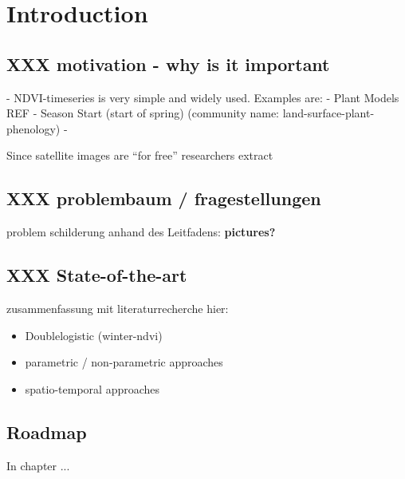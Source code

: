 \chapter{Introduction}

\section{XXX motivation - why is it important}{
    - NDVI-timeseries is very simple and widely used. 
        Examples are: 
            - Plant Models REF
            - Season Start (start of spring) (community name: land-surface-plant-phenology)
            - 
    
    Since satellite images are ``for free'' researchers extract 
}


\section{XXX problembaum / fragestellungen}{
    problem schilderung anhand des Leitfadens:
    \textbf{pictures?}
}



\section{XXX State-of-the-art}{
    zusammenfassung mit literaturrecherche hier:
    \begin{itemize}
        \item Doublelogistic (winter-ndvi)
        \item parametric / non-parametric approaches
        \item spatio-temporal approaches
    \end{itemize}
}


\section{Roadmap}{
    In chapter ... 
}

